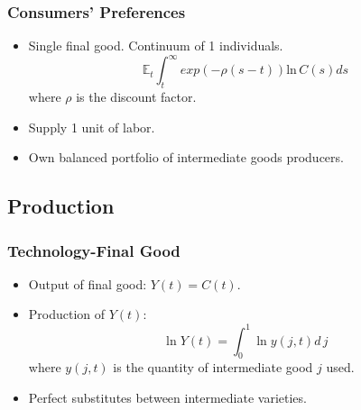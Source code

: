 \documentclass{beamer}
\begin{document}
\begin{frame}[t]\frametitle{Consumers' Preferences} 
  \begin{itemize}
    \item<+-> Single final good.  Continuum of 1 individuals.
      \begin{equation*} \label{eq:pref}
        \mathbb{E}_t \int_t^\infty exp(-\rho(s - t))\mathrm{ln}\,   C(s)ds
      \end{equation*}
      where $\rho$ is the discount factor.
      
  \item<+-> Supply 1 unit of labor.
  \item<+-> Own balanced portfolio of intermediate goods producers.
  \end{itemize}
\end{frame}

\subsection{Production}
\label{sub:production}

\begin{frame}[t]\frametitle{Technology-Final Good} 
  \begin{itemize}
    \item<+-> Output of final good: $Y(t) = C(t)$.
    
    \item<+-> Production of $Y(t)$:
      \begin{equation*} \label{eq:tech_output}
        \ln Y(t) = \int_{0}^{1} \ln y(j, t) d\,j 
      \end{equation*}
      where $y(j, t)$ is the quantity of intermediate good $j$ used.
    \item<+-> Perfect substitutes between intermediate varieties.
    
  \end{itemize}
\end{frame}
\end{document}
